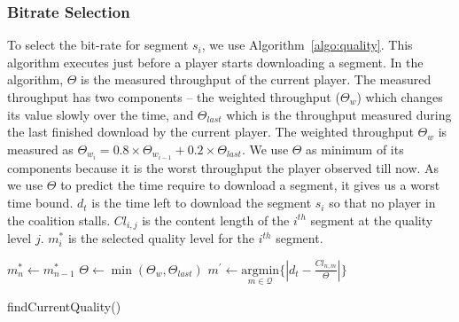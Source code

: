 \subsubsection{Bitrate Selection}
To select the bit-rate for segment $s_i$, we use Algorithm~\ref{algo:quality}. This algorithm executes just before a player starts downloading a segment. In the algorithm, $\varTheta$ is the measured throughput of the current player. The measured throughput has two components -- the weighted throughput ($\varTheta_w$) which changes its value slowly over the time, and $\varTheta_{last}$ which is the throughput measured during the last finished download by the current player. The weighted throughput $\varTheta_{w}$ is measured as $\varTheta_{w_i} = 0.8 \times \varTheta_{w_{i-1}} + 0.2 \times \varTheta_{last}$. We use $\varTheta$ as minimum of its components because it is the worst throughput the player observed till now. As we use $\varTheta$ to predict the time require to download a segment, it gives us a worst time bound. $d_t$ is the time left to download the segment $s_i$ so that no player in the coalition stalls. $Cl_{i,j}$ is the content length of the $i^{th}$ segment at the quality level $j$. $m^*_i$ is the selected quality level for the $i^{th}$ segment. 
\begin{algorithm}[!ht]
    \scriptsize
	\DontPrintSemicolon
	$m^*_{n} \leftarrow m^*_{n-1}$ \; \label{algo:quality:line:mstar}
	$\varTheta \leftarrow \min(\varTheta_w, \varTheta_{last})$ \; \label{algo:quality:line:theta}
	$m^\prime \leftarrow \underset{m \in \mathcal{Q}}{\mathrm{argmin}} \{\left| d_t - \frac{Cl_{n,m}}{\varTheta}\right| \} $\; \label{algo:quality:line:mprime}
	\caption{\label{algo:quality}findCurrentQuality()}
\end{algorithm}
